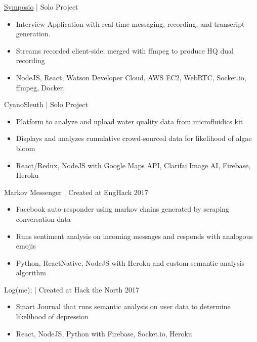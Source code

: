 \documentclass[]{friggeri-cv}
\begin{document}
\begin{entrylist}
	\entry
	{\href{https://symposio.stream}{Symposio\textsuperscript{\faExternalLink}} | \href{https://github.com/suzyng83209/symposio}{\faGithub}}
	{\vspace{0.5\parsep}Solo Project}
	{
		\begin{itemize}[leftmargin=*]\itemsep0.1cm
			\vspace{-0.4cm}
			\item Interview Application with real-time messaging, recording, and transcript generation.
			\item Streams recorded client-side; merged with ffmpeg to produce HQ dual recording
			\item NodeJS, React, Watson Developer Cloud, AWS EC2, WebRTC, Socket.io, ffmpeg, Docker. 
		\end{itemize}
	}
	\entry
	{CyanoSleuth | \href{https://github.com/suzyng83209/cyanosleuth}{\faGithub}}
	{\vspace{0.5\parsep}Solo Project}
	{
		\begin{itemize}[leftmargin=*]\itemsep0.1cm
			\vspace{-0.4cm}
			\item Platform to analyze and upload water quality data from microfluidics kit
			\item Displays and analyzes cumulative crowd-sourced data for likelihood of algae bloom
			\item React/Redux, NodeJS with Google Maps API, Clarifai Image AI, Firebase, Heroku
		\end{itemize}
	}
	\entry
	{Markov Messenger | \href{https://github.com/suzyng83209/markov-messenger-bot}{\faGithub}}
	{\vspace{0.5\parsep}Created at EngHack 2017}
	{
		\begin{itemize}[leftmargin=*]\itemsep0.1cm
			\vspace{-0.4cm}
			\item Facebook auto-responder using markov chains generated by scraping conversation data
			\item Runs sentiment analysis on incoming messages and responds with analogous emojis
			\item Python, ReactNative, NodeJS with Heroku and custom semantic analysis algorithm
		\end{itemize}
	}
	\entry
	{Log(me); | \href{https://github.com/suzyng83209/htn2017}{\faGithub}}
	{\vspace{0.5\parsep}Created at Hack the North 2017}
	{
		\begin{itemize}[leftmargin=*]\itemsep0.1cm
			\vspace{-0.4cm}
			\item Smart Journal that runs semantic analysis on user data to determine likelihood of depression
			\item React, NodeJS, Python with Firebase, Socket.io, Heroku
		\end{itemize}
	}
\end{entrylist}
\end{document}
